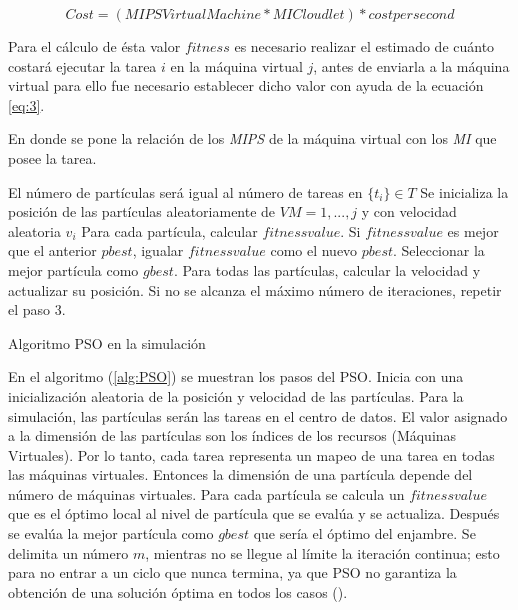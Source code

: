 \begin{equation} \label{eq:3}
Cost = (MIPS Virtual Machine * MI Cloudlet ) * cost per second 
\end{equation}

Para el cálculo de ésta valor $fitness$ es necesario realizar el estimado de cuánto costará ejecutar la tarea $i$ en la máquina virtual $j$, antes de enviarla a la máquina virtual para ello fue necesario establecer dicho valor con ayuda de la ecuación \ref{eq:3}.




En donde se pone la relación de los \textit{MIPS} de la máquina virtual con los \textit{MI} que posee la tarea.




\begin{algorithm} 
	\begin{algorithmic}[1]
		\State El número de partículas será igual al número de tareas en $ \{ t_i \} \in T $
		\State Se inicializa la posición de las partículas aleatoriamente de $VM = 1,...,j $ y con velocidad aleatoria $v_i$
		\State Para cada partícula, calcular $fitness value$.
		\State Si $fitness value$ es mejor que el anterior $pbest$, igualar $fitness value$ como el nuevo $pbest$.
		\State Seleccionar la mejor partícula como $gbest$.
		\State Para todas las partículas, calcular la velocidad y actualizar su posición.
		\State Si no se alcanza el máximo número de iteraciones, repetir el paso 3.
		
	\end{algorithmic} 
	\caption{Algoritmo PSO en la simulación}
	\label{alg:PSO}
\end{algorithm}

\newpage

En el algoritmo (\ref{alg:PSO}) se muestran los pasos del PSO. Inicia con una inicialización aleatoria de la posición y velocidad de las partículas. Para la simulación, las partículas serán las tareas en el centro de datos.
El valor asignado a la dimensión de las partículas son los índices de los recursos (Máquinas Virtuales). Por lo tanto, cada tarea representa un mapeo de una tarea en todas las máquinas virtuales. Entonces la dimensión de una partícula depende del número de máquinas virtuales.
Para cada partícula se calcula un $fitnessvalue$ que es el óptimo local al nivel de partícula que se evalúa y se actualiza. 
Después se evalúa la mejor partícula como $gbest$ que sería el óptimo del enjambre.
Se delimita un número $m$, mientras no se llegue al límite la iteración continua; esto para no entrar a un ciclo que nunca termina, ya que PSO  no garantiza la obtención de una solución óptima en todos los casos (\cite{osman2012}).


